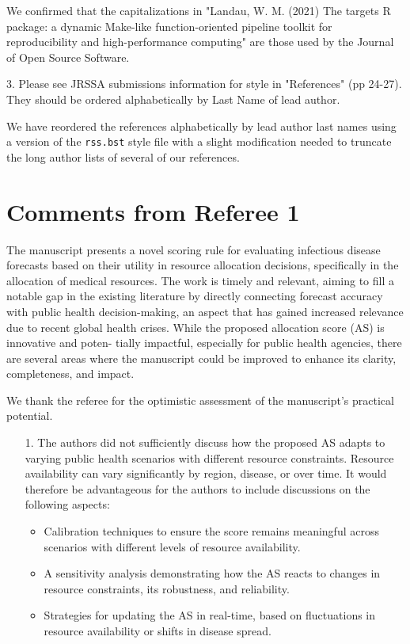\documentclass{article}
\begin{document}
We confirmed that
the capitalizations in "Landau, W. M. (2021) The targets R package: a dynamic
Make-like function-oriented pipeline toolkit for reproducibility and high-performance
computing" are those used by the Journal of Open Source Software.

\begin{quotebar}
3. Please see JRSSA submissions information for style in "References" (pp 24-27). They
should be ordered alphabetically by Last Name of lead author.
\end{quotebar}

We have reordered the references alphabetically by lead author last names
using a version of the \texttt{rss.bst} style file with a slight modification needed to
truncate the long author lists of several of our references.


\section*{Comments from Referee 1}

\begin{quotebar}
The manuscript presents a novel scoring rule for evaluating infectious disease forecasts based on their utility in resource allocation decisions, specifically in the allocation of medical resources. The work is timely and relevant, aiming to fill a notable gap in the existing literature by directly connecting forecast accuracy with public health decision-making, an aspect that has gained increased relevance due to recent global health crises. While the proposed allocation score (AS) is innovative and poten- tially impactful, especially for public health agencies, there are several areas where the manuscript could be improved to enhance its clarity, completeness, and impact.
\end{quotebar}

We thank the referee for the optimistic assessment of the manuscript's practical potential. 

\begin{quotebar}
\begin{enumerate}
  \item[1.] The authors did not sufficiently discuss how the proposed AS adapts to varying public health scenarios with different resource constraints. Resource availability can vary significantly by region, disease, or over time. It would therefore be advantageous for the authors to include discussions on the following aspects:
    \begin{itemize}
    \item Calibration techniques to ensure the score remains meaningful across scenarios with different levels of resource availability.
    \item A sensitivity analysis demonstrating how the AS reacts to changes in resource constraints, its robustness, and reliability.
    \item Strategies for updating the AS in real-time, based on fluctuations in resource availability or shifts in disease spread.
    \end{itemize}
\end{enumerate}
\end{quotebar}
\end{document}
